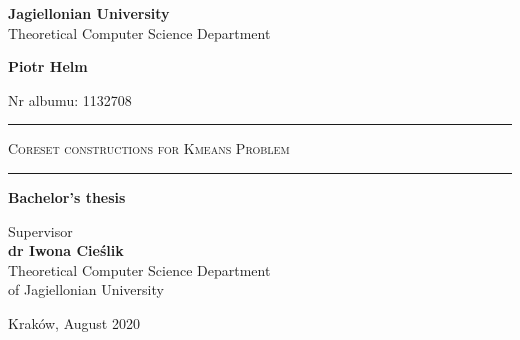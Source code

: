 \begin{titlepage}
\begin{center}
    \LARGE
    \textbf{Jagiellonian University}\\
    Theoretical Computer Science Department

    \vspace{1.5in}
    \Large
    \textbf{Piotr Helm}

    \large
    Nr albumu: 1132708
    
    \vspace{0.5em}
    \LARGE
    \rule{\textwidth}{1pt}
    \textsc{Coreset constructions for Kmeans Problem}
    \rule{\textwidth}{1pt}

    \vspace{1em}
    \Large
    \textbf{Bachelor’s thesis}\\

    \large
    \vspace{1in}
    \hfill
    \parbox{0.8\textwidth}{
        Supervisor \\
        \textbf{dr Iwona Cieślik} \\
        Theoretical Computer Science Department\\
        of Jagiellonian University
        }

    \vfill
    \Large
    Kraków, August 2020
\end{center}
\end{titlepage}
